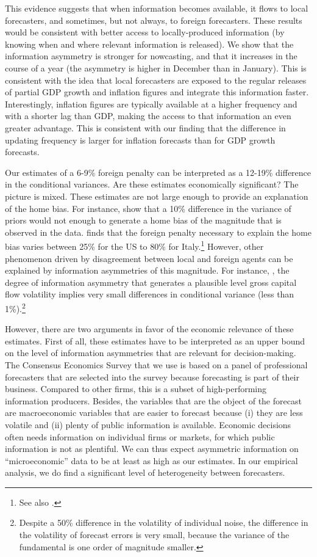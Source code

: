 This evidence suggests that when information becomes available, it flows to local forecasters, and sometimes, but not always, to foreign forecasters. These results would be consistent with better access to locally-produced information (by knowing when and where relevant information is released). We show that the information asymmetry is stronger for nowcasting, and that it increases in the course of a year (the asymmetry is higher in December than in January). This is consistent with the idea that local forecasters are exposed to the regular releases of partial GDP growth and inflation figures and integrate this information faster. Interestingly, inflation figures are typically available at a higher frequency and with a shorter lag than GDP, making the access to that information an even greater advantage. This is consistent with our finding that the difference in updating frequency is larger for inflation forecasts than for GDP growth forecasts.

Our estimates of a 6-9\% foreign penalty can be interpreted as a 12-19\% difference in the conditional variances. Are these estimates economically significant? The picture is mixed. These estimates are not large enough to provide an explanation of the home bias. For instance, \citet{VanNieuwerburghVeldkamp2009} show that a 10\% difference in the variance of priors would not enough to generate a home bias of the magnitude that is observed in the data. \citet{Jeske2001} finds that the foreign penalty necessary to explain the home bias varies between 25\% for the US to 80\% for Italy.\footnote{See also \citet{Glassman2001}.} However, other phenomenon driven by disagreement between local and foreign agents can be explained by information asymmetries of this magnitude. For instance, \citet{TillevanWincoop2014}, the degree of information asymmetry that generates a plausible level gross capital flow volatility implies very small differences in conditional variance (less than 1\%).\footnote{Despite a 50\% difference in the volatility of individual noise, the difference in the volatility of forecast errors is very small, because the variance of the fundamental is one order of magnitude smaller.}

However, there are two arguments in favor of the economic relevance of these estimates. First of all, these estimates have to be interpreted as an upper bound on the level of information asymmetries that are relevant for decision-making. The Consensus Economics Survey that we use is based on a panel of professional forecasters that are selected into the survey because forecasting is part of their business. Compared to other firms, this is a subset of high-performing information producers. Besides, the variables that are the object of the forecast are macroeconomic variables that are easier to forecast because (i) they are less volatile and (ii) plenty of public information is available. Economic decisions often needs information on individual firms or markets, for which public information is not as plentiful. We can thus expect asymmetric information on ``microeconomic'' data to be at least as high as our estimates. In our empirical analysis, we do find a significant level of heterogeneity between forecasters. 

